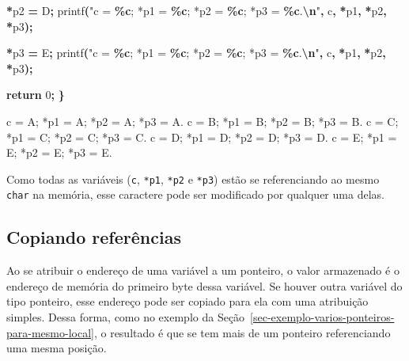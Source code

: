 \documentclass[
  11pt,
  a4paper,
]{scrbook}
\newenvironment{Shaded}{\begin{snugshade}}{\end{snugshade}}
\newcommand{\CharTok}[1]{\textcolor[rgb]{0.31,0.60,0.02}{#1}}
\newcommand{\ControlFlowTok}[1]{\textcolor[rgb]{0.13,0.29,0.53}{\textbf{#1}}}
\newcommand{\DecValTok}[1]{\textcolor[rgb]{0.00,0.00,0.81}{#1}}
\newcommand{\NormalTok}[1]{#1}
\newcommand{\OperatorTok}[1]{\textcolor[rgb]{0.81,0.36,0.00}{\textbf{#1}}}
\newcommand{\SpecialCharTok}[1]{\textcolor[rgb]{0.81,0.36,0.00}{\textbf{#1}}}
\newcommand{\StringTok}[1]{\textcolor[rgb]{0.31,0.60,0.02}{#1}}
\begin{document}
\begin{Shaded}
\begin{Highlighting}[]
    \OperatorTok{*}\NormalTok{p2 }\OperatorTok{=} \CharTok{\textquotesingle{}D\textquotesingle{}}\OperatorTok{;}
\NormalTok{    printf}\OperatorTok{(}\StringTok{"c = }\SpecialCharTok{\%c}\StringTok{; *p1 = }\SpecialCharTok{\%c}\StringTok{; *p2 = }\SpecialCharTok{\%c}\StringTok{; *p3 = }\SpecialCharTok{\%c}\StringTok{.}\SpecialCharTok{\textbackslash{}n}\StringTok{"}\OperatorTok{,}\NormalTok{ c}\OperatorTok{,} \OperatorTok{*}\NormalTok{p1}\OperatorTok{,} \OperatorTok{*}\NormalTok{p2}\OperatorTok{,} \OperatorTok{*}\NormalTok{p3}\OperatorTok{);}

    \OperatorTok{*}\NormalTok{p3 }\OperatorTok{=} \CharTok{\textquotesingle{}E\textquotesingle{}}\OperatorTok{;}
\NormalTok{    printf}\OperatorTok{(}\StringTok{"c = }\SpecialCharTok{\%c}\StringTok{; *p1 = }\SpecialCharTok{\%c}\StringTok{; *p2 = }\SpecialCharTok{\%c}\StringTok{; *p3 = }\SpecialCharTok{\%c}\StringTok{.}\SpecialCharTok{\textbackslash{}n}\StringTok{"}\OperatorTok{,}\NormalTok{ c}\OperatorTok{,} \OperatorTok{*}\NormalTok{p1}\OperatorTok{,} \OperatorTok{*}\NormalTok{p2}\OperatorTok{,} \OperatorTok{*}\NormalTok{p3}\OperatorTok{);}

    \ControlFlowTok{return} \DecValTok{0}\OperatorTok{;}
\OperatorTok{\}}
\end{Highlighting}
\end{Shaded}

\begin{Shaded}
\begin{Highlighting}[]
\NormalTok{c = A; *p1 = A; *p2 = A; *p3 = A.}
\NormalTok{c = B; *p1 = B; *p2 = B; *p3 = B.}
\NormalTok{c = C; *p1 = C; *p2 = C; *p3 = C.}
\NormalTok{c = D; *p1 = D; *p2 = D; *p3 = D.}
\NormalTok{c = E; *p1 = E; *p2 = E; *p3 = E.}
\end{Highlighting}
\end{Shaded}

Como todas as variáveis (\texttt{c}, \texttt{*p1}, \texttt{*p2} e
\texttt{*p3}) estão se referenciando ao mesmo \texttt{char} na memória,
esse caractere pode ser modificado por qualquer uma delas.

\subsection{Copiando referências}\label{copiando-referuxeancias}

Ao se atribuir o endereço de uma variável a um ponteiro, o valor
armazenado é o endereço de memória do primeiro byte dessa variável. Se
houver outra variável do tipo ponteiro, esse endereço pode ser copiado
para ela com uma atribuição simples. Dessa forma, como no exemplo da
Seção~\ref{sec-exemplo-varios-ponteiros-para-mesmo-local}, o resultado é
que se tem mais de um ponteiro referenciando uma mesma posição.
\end{document}
